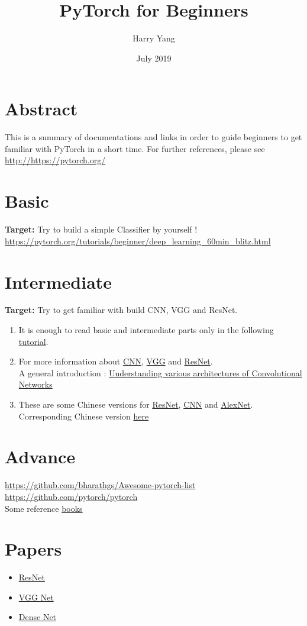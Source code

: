 \documentclass{article}
\title{PyTorch for Beginners}
\author{Harry Yang}
\date{July 2019}
\begin{document}
\maketitle

\section{Abstract}
This is a summary of documentations and links in order to guide beginners to get familiar with PyTorch in a short time. For further references, please see  \url{http://https://pytorch.org/} 
\section{Basic}
\textbf{Target: } Try to build a simple Classifier by yourself ! \\
\url{https://pytorch.org/tutorials/beginner/deep_learning_60min_blitz.html}
\section{Intermediate}
\textbf{Target: } Try to get familiar with build CNN, VGG and ResNet. \\
\begin{enumerate}
    \item It is enough to read basic and intermediate parts only in the following \href{https://github.com/yunjey/pytorch-tutorial/tree/master/tutorials}{tutorial}.
    \item For more information about \href{https://github.com/yunjey/pytorch-tutorial/tree/master/tutorials}{CNN}, \href{https://github.com/yunjey/pytorch-tutorial/tree/master/tutorials}{VGG} and \href{https://towardsdatascience.com/an-overview-of-resnet-and-its-variants-5281e2f56035}{ResNet}.\\
    A general introduction : \href{https://cv-tricks.com/cnn/understand-resnet-alexnet-vgg-inception/}{Understanding various architectures of Convolutional Networks}
    \item These are some Chinese versions for \href{https://zhuanlan.zhihu.com/p/31852747}{ResNet}, \href{https://blog.csdn.net/v_JULY_v/article/details/51812459}{CNN} and \href{https://blog.csdn.net/daydayup_668819/article/details/79744095}{AlexNet}.\\
    Corresponding Chinese version \href{https://zhuanlan.zhihu.com/p/32116277}{here}
\end{enumerate}

\section{Advance}
\url{https://github.com/bharathgs/Awesome-pytorch-list}\\
\url{https://github.com/pytorch/pytorch}\\
Some reference \href{https://srdas.github.io/DLBook/ConvNets.html}{books}
\section{Papers}
\begin{itemize}
    \item 
    \href{https://arxiv.org/pdf/1512.03385.pdf}{ResNet}
    \item
    \href{https://arxiv.org/pdf/1409.1556.pdf}{VGG Net}
    \item
    \href{https://arxiv.org/pdf/1608.06993.pdf}{Dense Net}
\end{itemize}
\end{document}
